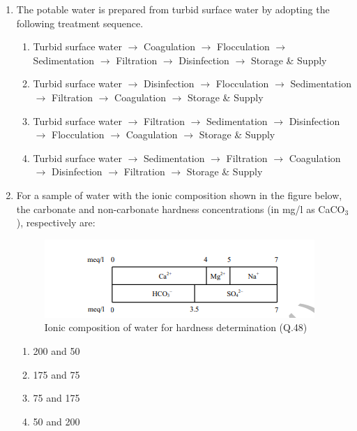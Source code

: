 \documentclass[journal,12pt,onecolumn]{IEEEtran}
\theoremstyle{remark}
\begin{document}
\begin{enumerate}
\item The potable water is prepared from turbid surface water by adopting the following treatment sequence. \hfill{}

\begin{multicols}{2}
\begin{enumerate}
\item Turbid surface water $\rightarrow$ Coagulation $\rightarrow$ Flocculation $\rightarrow$ Sedimentation $\rightarrow$ Filtration $\rightarrow$ Disinfection $\rightarrow$ Storage \& Supply
\item Turbid surface water $\rightarrow$ Disinfection $\rightarrow$ Flocculation $\rightarrow$ Sedimentation $\rightarrow$ Filtration $\rightarrow$ Coagulation $\rightarrow$ Storage \& Supply
\item Turbid surface water $\rightarrow$ Filtration $\rightarrow$ Sedimentation $\rightarrow$ Disinfection $\rightarrow$ Flocculation $\rightarrow$ Coagulation $\rightarrow$ Storage \& Supply
\item Turbid surface water $\rightarrow$ Sedimentation $\rightarrow$ Filtration $\rightarrow$ Coagulation $\rightarrow$ Disinfection $\rightarrow$ Filtration $\rightarrow$ Storage \& Supply
\end{enumerate}
\end{multicols}






\item For a sample of water with the ionic composition shown in the figure below, the carbonate and non-carbonate hardness concentrations (in mg/l as CaCO$_3$), respectively are: \hfill{}

\begin{figure}[H]
\centering
\includegraphics[width=0.6\linewidth]{figs/image16.png}
\caption{Ionic composition of water for hardness determination (Q.48)}
\label{fig:q48}
\end{figure}

\begin{multicols}{4}
\begin{enumerate}
\item 200 and 50
\item 175 and 75
\item 75 and 175
\item 50 and 200
\end{enumerate}
\end{multicols}


\end{enumerate}
\end{document}
